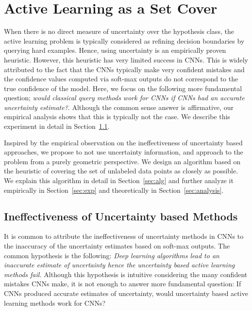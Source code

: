 \documentclass{article}
\begin{document}
\section{Active Learning as a Set Cover}
When there is no direct measure of uncertainty over the hypothesis class, the active learning problem is typically considered as refining decision boundaries by querying hard examples. Hence, using uncertainty is an empirically proven heuristic. However, this heuristic has very limited success in CNNs. This is widely attributed to the fact that the CNNs typically make very confident mistakes and the confidence values computed via soft-max outputs do not correspond to the true confidence of the model. Here, we focus on the following more fundamental question; \emph{would classical query methods work for CNNs if CNNs had an accurate uncertainty estimate?}. Although the common sense answer is affirmative, our empirical analysis shows that this is typically not the case. We describe this experiment in detail in Section~\ref{sec:whatif}.

Inspired by the empirical observation on the ineffectiveness of uncertainty based approaches, we propose to not use uncertainty information, and approach to the problem from a purely geometric perspective. We design an algorithm based on the heuristic of covering the set of unlabeled data points as closely as possible. We explain this algorithm in detail in Section~\ref{sec:alg} and further analyze it empirically in Section~\ref{sec:exp} and theoretically in Section~\ref{sec:analysis}.

\subsection{Ineffectiveness of Uncertainty based Methods}
\label{sec:whatif}
It is common to attribute the ineffectiveness of uncertainty methods in CNNs to the inaccuracy of the uncertainty estimates based on soft-max outputs. The common hypothesis is the following: \emph{Deep learning algorithms lead to an inaccurate estimate of uncertainty hence the uncertainty based active learning methods fail.} Although this hypothesis is intuitive considering the many confident mistakes CNNs make, it is not enough to answer more fundamental question: If CNNs produced accurate estimates of uncertainty, would uncertainty based active learning methods work for CNNs?
\end{document}
